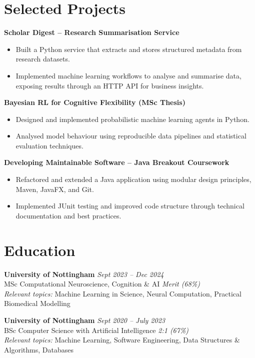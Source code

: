 \documentclass[a4paper,10pt]{article}
\begin{document}
\section*{Selected Projects}
\textbf{Scholar Digest -- Research Summarisation Service}
\begin{itemize}
    \item Built a Python service that extracts and stores structured metadata from research datasets.
    \item Implemented machine learning workflows to analyse and summarise data, exposing results through an HTTP API for business insights.
\end{itemize}

\textbf{Bayesian RL for Cognitive Flexibility (MSc Thesis)}
\begin{itemize}
    \item Designed and implemented probabilistic machine learning agents in Python.
    \item Analysed model behaviour using reproducible data pipelines and statistical evaluation techniques.
\end{itemize}

\textbf{Developing Maintainable Software -- Java Breakout Coursework}
\begin{itemize}
    \item Refactored and extended a Java application using modular design principles, Maven, JavaFX, and Git.
    \item Implemented JUnit testing and improved code structure through technical documentation and best practices.
\end{itemize}

\section*{Education}
\textbf{University of Nottingham} \hfill \textit{Sept 2023 -- Dec 2024}\\
MSc Computational Neuroscience, Cognition \& AI \hfill \textit{Merit (68\%)}\\
\textit{Relevant topics:} Machine Learning in Science, Neural Computation, Practical Biomedical Modelling

\vspace{2pt}
\textbf{University of Nottingham} \hfill \textit{Sept 2020 -- July 2023}\\
BSc Computer Science with Artificial Intelligence \hfill \textit{2:1 (67\%)}\\
\textit{Relevant topics:} Machine Learning, Software Engineering, Data Structures \& Algorithms, Databases
\end{document}
